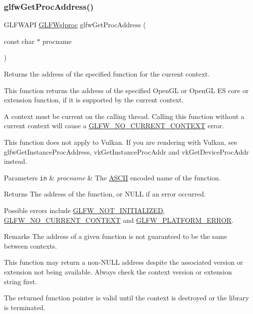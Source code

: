 \subsubsection{\texorpdfstring{glfw\+Get\+Proc\+Address()}{glfwGetProcAddress()}}
{\footnotesize\ttfamily G\+L\+F\+W\+A\+PI \hyperlink{group__context_ga3d47c2d2fbe0be9c505d0e04e91a133c}{G\+L\+F\+Wglproc} glfw\+Get\+Proc\+Address (\begin{DoxyParamCaption}\item[{const char $\ast$}]{procname }\end{DoxyParamCaption})}



Returns the address of the specified function for the current context. 

This function returns the address of the specified Open\+GL or Open\+GL ES core or extension function, if it is supported by the current context.

A context must be current on the calling thread. Calling this function without a current context will cause a \hyperlink{group__errors_gaa8290386e9528ccb9e42a3a4e16fc0d0}{G\+L\+F\+W\+\_\+\+N\+O\+\_\+\+C\+U\+R\+R\+E\+N\+T\+\_\+\+C\+O\+N\+T\+E\+XT} error.

This function does not apply to Vulkan. If you are rendering with Vulkan, see glfw\+Get\+Instance\+Proc\+Address, {\ttfamily vk\+Get\+Instance\+Proc\+Addr} and {\ttfamily vk\+Get\+Device\+Proc\+Addr} instead.


\begin{DoxyParams}[1]{Parameters}
\mbox{\tt in}  & {\em procname} & The \hyperlink{structASCII}{A\+S\+C\+II} encoded name of the function. \\
\hline
\end{DoxyParams}
\begin{DoxyReturn}{Returns}
The address of the function, or {\ttfamily N\+U\+LL} if an error occurred.
\end{DoxyReturn}
Possible errors include \hyperlink{group__errors_ga2374ee02c177f12e1fa76ff3ed15e14a}{G\+L\+F\+W\+\_\+\+N\+O\+T\+\_\+\+I\+N\+I\+T\+I\+A\+L\+I\+Z\+ED}, \hyperlink{group__errors_gaa8290386e9528ccb9e42a3a4e16fc0d0}{G\+L\+F\+W\+\_\+\+N\+O\+\_\+\+C\+U\+R\+R\+E\+N\+T\+\_\+\+C\+O\+N\+T\+E\+XT} and \hyperlink{group__errors_gad44162d78100ea5e87cdd38426b8c7a1}{G\+L\+F\+W\+\_\+\+P\+L\+A\+T\+F\+O\+R\+M\+\_\+\+E\+R\+R\+OR}.

\begin{DoxyRemark}{Remarks}
The address of a given function is not guaranteed to be the same between contexts.

This function may return a non-\/{\ttfamily N\+U\+LL} address despite the associated version or extension not being available. Always check the context version or extension string first.
\end{DoxyRemark}
The returned function pointer is valid until the context is destroyed or the library is terminated.

